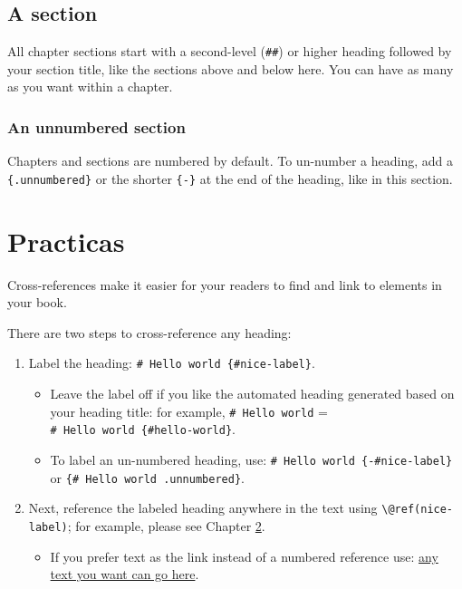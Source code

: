 \documentclass[
]{book}
\providecommand{\tightlist}{%
  \setlength{\itemsep}{0pt}\setlength{\parskip}{0pt}}
\begin{document}
\hypertarget{a-section}{%
\section{A section}\label{a-section}}

All chapter sections start with a second-level (\texttt{\#\#}) or higher heading followed by your section title, like the sections above and below here. You can have as many as you want within a chapter.

\hypertarget{an-unnumbered-section}{%
\subsection*{An unnumbered section}\label{an-unnumbered-section}}

Chapters and sections are numbered by default. To un-number a heading, add a \texttt{\{.unnumbered\}} or the shorter \texttt{\{-\}} at the end of the heading, like in this section.

\hypertarget{cross}{%
\chapter{Practicas}\label{cross}}

Cross-references make it easier for your readers to find and link to elements in your book.

There are two steps to cross-reference any heading:

\begin{enumerate}
\def\labelenumi{\arabic{enumi}.}
\tightlist
\item
  Label the heading: \texttt{\#\ Hello\ world\ \{\#nice-label\}}.

  \begin{itemize}
  \tightlist
  \item
    Leave the label off if you like the automated heading generated based on your heading title: for example, \texttt{\#\ Hello\ world} = \texttt{\#\ Hello\ world\ \{\#hello-world\}}.
  \item
    To label an un-numbered heading, use: \texttt{\#\ Hello\ world\ \{-\#nice-label\}} or \texttt{\{\#\ Hello\ world\ .unnumbered\}}.
  \end{itemize}
\item
  Next, reference the labeled heading anywhere in the text using \texttt{\textbackslash{}@ref(nice-label)}; for example, please see Chapter \ref{cross}.

  \begin{itemize}
  \tightlist
  \item
    If you prefer text as the link instead of a numbered reference use: \protect\hyperlink{cross}{any text you want can go here}.
  \end{itemize}
\end{enumerate}
\end{document}
